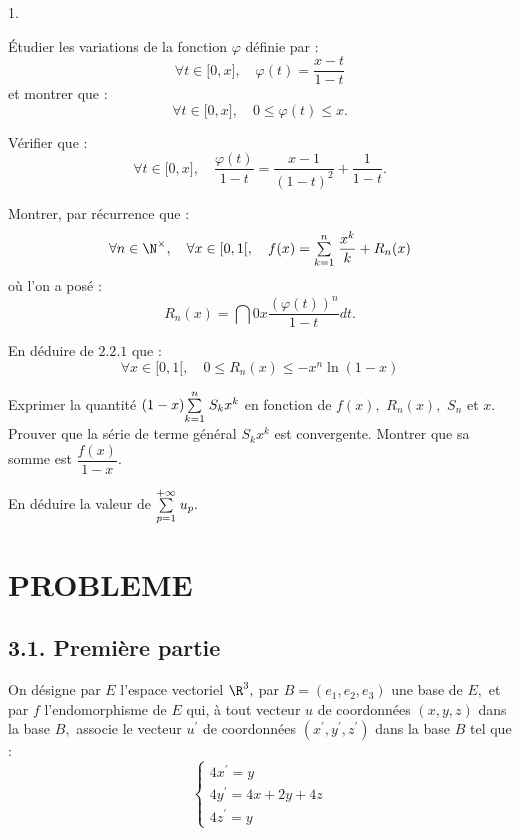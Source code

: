 \documentclass[11pt]{article}%
\begin{document}
\begin{noliste}{1.}
 \setlength{\itemsep}{4mm}
\item Étudier les variations de la fonction $\varphi $ définie par :
\[
\forall t\in \lbrack 0,x],\quad \varphi (t) = \dfrac{x-t}{1-t}
\]
et montrer que :
\[
\forall t\in \lbrack 0,x],\quad 0\leq \varphi (t)\leq x.
\]

\item Vérifier que :
\[
\forall t\in \lbrack 0,x],\quad \dfrac{\varphi (t)}{1-t} =
\dfrac{x-1}{(1-t)^{2}} + \dfrac{1}{1-t}.
\]

\item Montrer, par récurrence que :
\[
\forall n\in \N^{\times },\quad \forall x\in \lbrack 0,1[,\quad
f(x) = \Sum{k = 1}{n}\dfrac{x^{k}}{k} + R_{n}(x)
\]
où l'on a posé :
\[
R_{n}(x) = \dint{0}{x}\dfrac{(\varphi (t))^{n}}{1-t}dt.
\]

\item En déduire de $2.2.1$ que :
\[
\forall x\in \lbrack 0,1[,\quad 0\leq R_{n}(x)\leq -x^{n}\ln (1-x)
\]

\item Exprimer la quantité $(1-x){\textstyle\sum\limits_{k = 1}^{n}}\hspace{.1cm}S_{k}x^{k}$ en
fonction de $f(x),$ $R_{n}(x),$ $S_{n}$ et $x.$\\
Prouver que la série de terme général $S_{k}x^{k}$ est convergente.
Montrer
que sa somme est $\dfrac{f(x)}{1-x}.$

\item En déduire la valeur de ${\textstyle\sum\limits_{p = 1}^{+ \infty }}\hspace{.1cm}u_{p}.$
\end{noliste}

\section*{PROBLEME}

\subsection*{3.1. Première partie}

On désigne par $E$ l'espace vectoriel $\R^{3},$ par $B =
(e_{1},e_{2},e_{3})$ une base de $E,$ et par $f$ l'endomorphisme de $E$
qui, à tout vecteur $u$ de coordonnées $(x,y,z)$ dans la base $B,$
associe
le vecteur $u^{\prime }$ de coordonnées $(x^{\prime },y^{\prime
},z^{\prime
})$ dans la base $B$ tel que :
\[
\left\{ 
\begin{array}{c}
4x^{\prime } = y \\
4y^{\prime } = 4x + 2y + 4z \\
4z^{\prime } = y
\end{array}
\right.
\]
\end{document}

